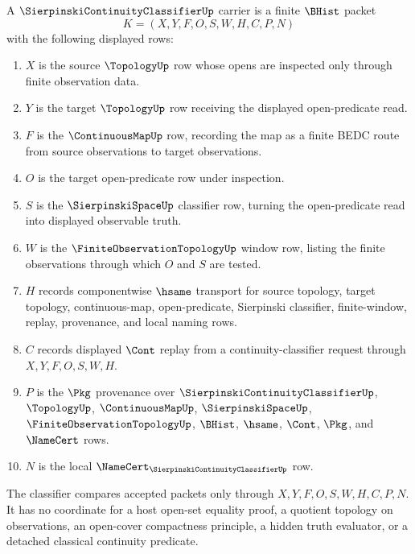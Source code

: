 \begin{definition}
\label{def:sierpinski-continuity-classifier-carrier}
A $\SierpinskiContinuityClassifierUp$ carrier is a finite $\BHist$ packet
$$
K=(X,Y,F,O,S,W,H,C,P,N)
$$
with the following displayed rows:
\begin{enumerate}
\item $X$ is the source $\TopologyUp$ row whose opens are inspected only through finite observation data.
\item $Y$ is the target $\TopologyUp$ row receiving the displayed open-predicate read.
\item $F$ is the $\ContinuousMapUp$ row, recording the map as a finite BEDC route from source observations to target observations.
\item $O$ is the target open-predicate row under inspection.
\item $S$ is the $\SierpinskiSpaceUp$ classifier row, turning the open-predicate read into displayed observable truth.
\item $W$ is the $\FiniteObservationTopologyUp$ window row, listing the finite observations through which $O$ and $S$ are tested.
\item $H$ records componentwise $\hsame$ transport for source topology, target topology, continuous-map, open-predicate, Sierpinski classifier, finite-window, replay, provenance, and local naming rows.
\item $C$ records displayed $\Cont$ replay from a continuity-classifier request through $X,Y,F,O,S,W,H$.
\item $P$ is the $\Pkg$ provenance over $\SierpinskiContinuityClassifierUp$, $\TopologyUp$, $\ContinuousMapUp$, $\SierpinskiSpaceUp$, $\FiniteObservationTopologyUp$, $\BHist$, $\hsame$, $\Cont$, $\Pkg$, and $\NameCert$ rows.
\item $N$ is the local $\NameCert_{\SierpinskiContinuityClassifierUp}$ row.
\end{enumerate}
The classifier compares accepted packets only through $X,Y,F,O,S,W,H,C,P,N$. It has no coordinate for a host open-set equality proof, a quotient topology on observations, an open-cover compactness principle, a hidden truth evaluator, or a detached classical continuity predicate.
\end{definition}

